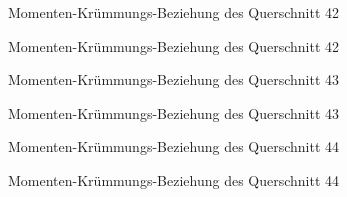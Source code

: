 \documentclass[
  11pt,
  letterpaper,
]{scrreprt}
\begin{document}
\begin{figure}[H]


\caption{\label{fig-qs_42}Momenten-Krümmungs-Beziehung des Querschnitt
42}

\end{figure}%

\begin{figure}[H]


\caption{\label{fig-m_chi_42}Momenten-Krümmungs-Beziehung des
Querschnitt 42}

\end{figure}%

\begin{figure}[H]


\caption{\label{fig-qs_43}Momenten-Krümmungs-Beziehung des Querschnitt
43}

\end{figure}%

\begin{figure}[H]


\caption{\label{fig-m_chi_43}Momenten-Krümmungs-Beziehung des
Querschnitt 43}

\end{figure}%

\begin{figure}[H]


\caption{\label{fig-qs_44}Momenten-Krümmungs-Beziehung des Querschnitt
44}

\end{figure}%

\begin{figure}[H]


\caption{\label{fig-m_chi_44}Momenten-Krümmungs-Beziehung des
Querschnitt 44}

\end{figure}%
\end{document}
